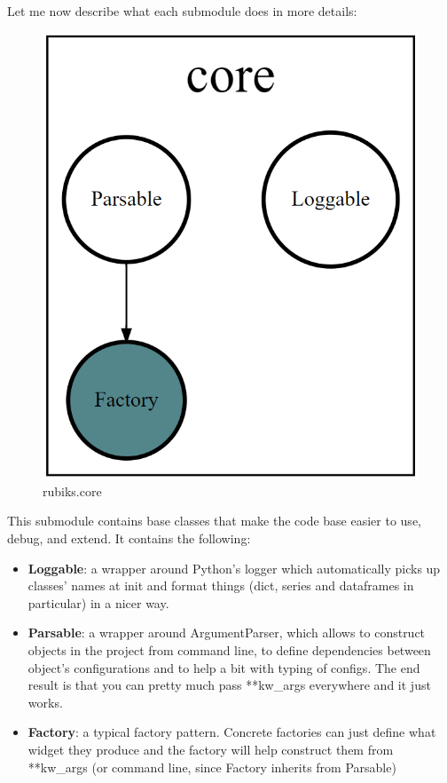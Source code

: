 

Let me now describe what each submodule does in more details:

\begin{figure}[H]
\centering
\includegraphics[scale=0.25]{./Figures/codebasecore}
\caption[Codebase]{rubiks.core}
\label{fig:Codebasecore}
\end{figure}
This submodule contains base classes that make the code base easier to use, debug, and extend. It contains the following:
\begin{itemize}
\item \textbf{Loggable}: a wrapper around Python's logger which automatically picks up classes' names at init and format things (dict, series and dataframes in particular) in a nicer way.
\item \textbf{Parsable}: a wrapper around ArgumentParser, which allows to construct objects in the project from command line, to define dependencies between object's configurations and to help a bit with typing of configs. The end result is that you can pretty much pass **kw\_args everywhere and it just works.
\item \textbf{Factory}: a typical factory pattern. Concrete factories can just define what widget they produce and the factory will help construct them from **kw\_args (or command line, since Factory inherits from Parsable)
\end{itemize}


